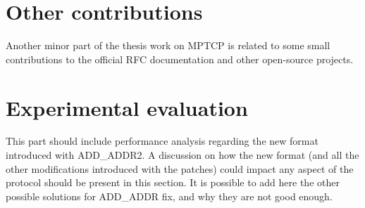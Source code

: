 \section{Other contributions}
Another minor part of the thesis work on MPTCP is related to some small contributions to the official RFC documentation and other open-source projects.

\section{Experimental evaluation}
This part should include performance analysis regarding the new format introduced with ADD\_ADDR2. A discussion on how the new format (and all the other modifications introduced with the patches) could impact any aspect of the protocol should be present in this section.
It is possible to add here the other possible solutions for ADD\_ADDR fix, and why they are not good enough. 